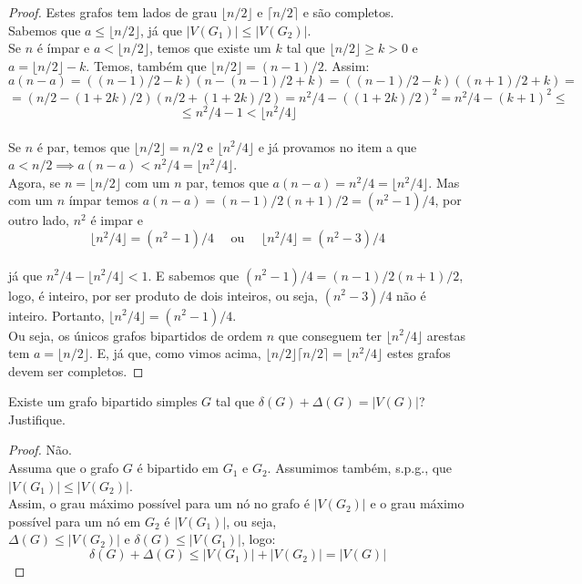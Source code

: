 \documentclass[12pt]{article}
\newenvironment{problem}[2][Ex]{\begin{trivlist}
\item[\hskip \labelsep {\bfseries #1}\hskip \labelsep {\bfseries #2.}]}{\end{trivlist}}
\begin{document}
\begin{proof}
Estes grafos tem lados de grau $\lfloor n/2 \rfloor$ e $\lceil n/2 \rceil$ e são completos. \\
Sabemos que $a \leq \lfloor n/2 \rfloor$, já que $|V(G_1)| \leq |V(G_2)|$. \\
Se $n$ é ímpar e $a < \lfloor n/2 \rfloor$, temos que existe um $k$ tal que $\lfloor n/2 \rfloor \geq k > 0$ e $a = \lfloor n/2 \rfloor -k$. Temos, também que $\lfloor n/2 \rfloor = (n-1)/2$. Assim:
$$ a(n-a) = ((n-1)/2 - k)(n - (n-1)/2 + k) = ((n-1)/2 - k)((n+1)/2 + k) = $$
$$ = (n/2 - (1+2k)/2)(n/2 + (1+2k)/2) = n^2/4 - ((1+2k)/2)^2 = n^2/4 - (k+1)^2 \leq $$
$$ \leq n^2/4 - 1 < \lfloor n^2/4 \rfloor $$ \\
Se $n$ é par, temos que $\lfloor n/2 \rfloor = n/2$ e $\lfloor n^2/4 \rfloor$ e já provamos no item a que $a < n/2 \implies a(n-a) < n^2/4 = \lfloor n^2/4 \rfloor$. \\
Agora, se $n = \lfloor n/2 \rfloor$ com um $n$ par, temos que $a(n-a) = n^2/4 = \lfloor n^2/4 \rfloor$. Mas com um $n$ ímpar temos $a(n-a) = (n-1)/2 (n+1)/2 = (n^2-1)/4$, por outro lado, $n^2$ é impar e
$$ \lfloor n^2/4 \rfloor = (n^2 - 1)/4 \quad \text{ ou } \quad \lfloor n^2/4 \rfloor = (n^2-3)/4 $$ \\
já que $n^2/4 - \lfloor n^2/4 \rfloor < 1$. E sabemos que $(n^2-1)/4 = (n-1)/2 (n+1)/2$, logo, é inteiro, por ser produto de dois inteiros, ou seja, $(n^2-3)/4$ não é inteiro. Portanto, $ \lfloor n^2/4 \rfloor = (n^2-1)/4 $. \\
Ou seja, os únicos grafos bipartidos de ordem $n$ que conseguem ter $\lfloor n^2/4 \rfloor$ arestas tem $a = \lfloor n/2 \rfloor$. E, já que, como vimos acima, $\lfloor n/2 \rfloor \lceil n/2 \rceil = \lfloor n^2/4 \rfloor$ estes grafos devem ser completos.
\end{proof}
 
\begin{problem}{E2}
Existe um grafo bipartido simples $G$ tal que $\delta(G) + \Delta(G) = |V(G)|$? Justifique.
\end{problem}

\begin{proof}
Não. \\
Assuma que o grafo $G$ é bipartido em $G_1$ e $G_2$. Assumimos também, s.p.g., que $|V(G_1)| \leq |V(G_2)|$. \\
Assim, o grau máximo possível para um nó no grafo é $|V(G_2)|$ e o grau máximo possível para um nó em $G_2$ é $|V(G_1)|$, ou seja, $\Delta(G) \leq |V(G_2)| \text{ e } \delta(G) \leq |V(G_1)|$, logo:
$$ \delta(G) + \Delta(G) \leq |V(G_1)| + |V(G_2)| = |V(G)| $$
\end{proof}
\end{document}

